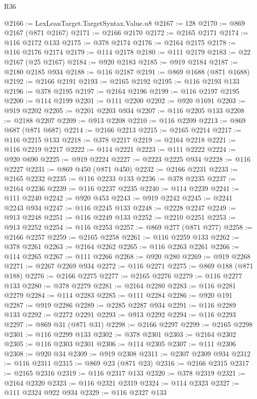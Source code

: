 \begin{lexlean}{R36}
\begin{coremodule}
@2166 := LexLeanTarget.TargetSyntax.Value.u8
@2167 := 128
@2170 := @869 @2167 (@871 @2167)
@2171 := @2166 @2170
@2172 := @2165 @2171
@2174 := @116 @2172 @133
@2175 := @378 @2174
@2176 := @2164 @2175
@2178 := @116 @2176 @2174
@2179 := @114 @2178
@2180 := @111 @2179
@2183 := @22 @2167 (@25 @2167)
@2184 := @920 @2183
@2185 := @919 @2184
@2187 := @2180 @2185 @934
@2188 := @116 @2187
@2191 := @869 @1688 (@871 @1688)
@2192 := @2166 @2191
@2193 := @2165 @2192
@2195 := @116 @2193 @133
@2196 := @378 @2195
@2197 := @2164 @2196
@2199 := @116 @2197 @2195
@2200 := @114 @2199
@2201 := @111 @2200
@2202 := @920 @1691
@2203 := @919 @2202
@2205 := @2201 @2203 @934
@2207 := @116 @2205 @133
@2208 := @2188 @2207
@2209 := @913 @2208
@2210 := @116 @2209
@2213 := @869 @687 (@871 @687)
@2214 := @2166 @2213
@2215 := @2165 @2214
@2217 := @116 @2215 @133
@2218 := @378 @2217
@2219 := @2164 @2218
@2221 := @116 @2219 @2217
@2222 := @114 @2221
@2223 := @111 @2222
@2224 := @920 @690
@2225 := @919 @2224
@2227 := @2223 @2225 @934
@2228 := @116 @2227
@2231 := @869 @450 (@871 @450)
@2232 := @2166 @2231
@2233 := @2165 @2232
@2235 := @116 @2233 @133
@2236 := @378 @2235
@2237 := @2164 @2236
@2239 := @116 @2237 @2235
@2240 := @114 @2239
@2241 := @111 @2240
@2242 := @920 @453
@2243 := @919 @2242
@2245 := @2241 @2243 @934
@2247 := @116 @2245 @133
@2248 := @2228 @2247
@2249 := @913 @2248
@2251 := @116 @2249 @133
@2252 := @2210 @2251
@2253 := @913 @2252
@2254 := @116 @2253
@2257 := @869 @277 (@871 @277)
@2258 := @2166 @2257
@2259 := @2165 @2258
@2261 := @116 @2259 @133
@2262 := @378 @2261
@2263 := @2164 @2262
@2265 := @116 @2263 @2261
@2266 := @114 @2265
@2267 := @111 @2266
@2268 := @920 @280
@2269 := @919 @2268
@2271 := @2267 @2269 @934
@2272 := @116 @2271
@2275 := @869 @188 (@871 @188)
@2276 := @2166 @2275
@2277 := @2165 @2276
@2279 := @116 @2277 @133
@2280 := @378 @2279
@2281 := @2164 @2280
@2283 := @116 @2281 @2279
@2284 := @114 @2283
@2285 := @111 @2284
@2286 := @920 @191
@2287 := @919 @2286
@2289 := @2285 @2287 @934
@2291 := @116 @2289 @133
@2292 := @2272 @2291
@2293 := @913 @2292
@2294 := @116 @2293
@2297 := @869 @31 (@871 @31)
@2298 := @2166 @2297
@2299 := @2165 @2298
@2301 := @116 @2299 @133
@2302 := @378 @2301
@2303 := @2164 @2302
@2305 := @116 @2303 @2301
@2306 := @114 @2305
@2307 := @111 @2306
@2308 := @920 @34
@2309 := @919 @2308
@2311 := @2307 @2309 @934
@2312 := @116 @2311
@2315 := @869 @23 (@871 @23)
@2316 := @2166 @2315
@2317 := @2165 @2316
@2319 := @116 @2317 @133
@2320 := @378 @2319
@2321 := @2164 @2320
@2323 := @116 @2321 @2319
@2324 := @114 @2323
@2327 := @111 @2324 @922 @934
@2329 := @116 @2327 @133

\end{coremodule}
\end{lexlean}
